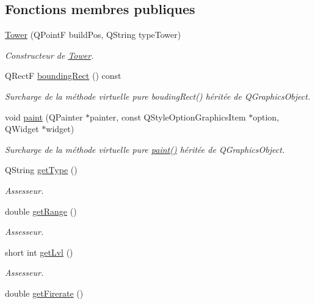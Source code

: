 \subsection*{Fonctions membres publiques}
\begin{DoxyCompactItemize}
\item 
\hyperlink{classTower_a7f9ceffca6b5ac42bd49619175cd5a22}{Tower} (QPointF buildPos, QString typeTower)
\begin{DoxyCompactList}\small\item\em Constructeur de \hyperlink{classTower}{Tower}. \end{DoxyCompactList}\item 
QRectF \hyperlink{classTower_a8fc14fa547a388fa8500f39551019d87}{boundingRect} () const 
\begin{DoxyCompactList}\small\item\em Surcharge de la méthode virtuelle pure boudingRect() héritée de QGraphicsObject. \end{DoxyCompactList}\item 
void \hyperlink{classTower_ad0804070755704b426ef9edaadc58e46}{paint} (QPainter $\ast$painter, const QStyleOptionGraphicsItem $\ast$option, QWidget $\ast$widget)
\begin{DoxyCompactList}\small\item\em Surcharge de la méthode virtuelle pure \hyperlink{classTower_ad0804070755704b426ef9edaadc58e46}{paint()} héritée de QGraphicsObject. \end{DoxyCompactList}\item 
QString \hyperlink{classTower_a0e330af9db954014fc40c2b5533095a1}{getType} ()
\begin{DoxyCompactList}\small\item\em Assesseur. \end{DoxyCompactList}\item 
double \hyperlink{classTower_ad56d1012706fe2b0d189bc5b3c0bdaad}{getRange} ()
\begin{DoxyCompactList}\small\item\em Assesseur. \end{DoxyCompactList}\item 
short int \hyperlink{classTower_afefd70c063a5e89d2490c3b4824d9684}{getLvl} ()
\begin{DoxyCompactList}\small\item\em Assesseur. \end{DoxyCompactList}\item 
double \hyperlink{classTower_abee41b219b8d886e34e4a7c9087d80fc}{getFirerate} ()

\end{DoxyCompactItemize}

